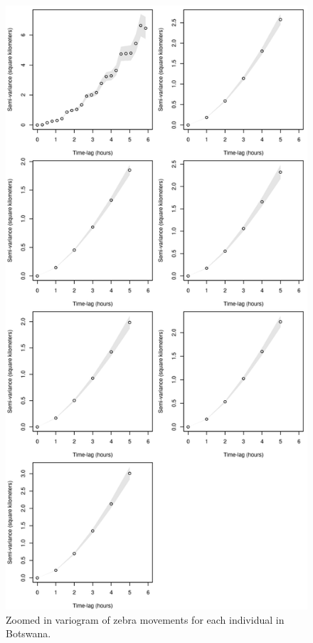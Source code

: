 \documentclass[12pt,a4paper, twoside, english]{article}
\begin{document}
\begin{figure}[H]
  \centering
  \includegraphics[height=0.97\textheight]{figures/Zebra_Vario_6h_BWA.png}
  \caption[6h Variogram of Ngamiland's zebras]{Zoomed in variogram of zebra movements for each individual in Botswana.}
  \label{fig:vario_6h_bwa}
\end{figure}
\end{document}
